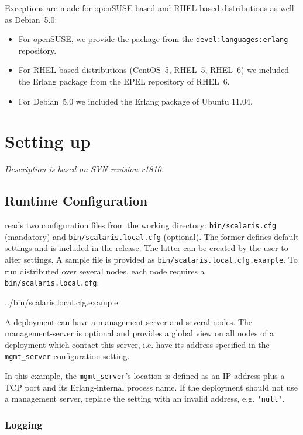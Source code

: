 \documentclass[a4paper]{scrreprt}
\newcommand{\codefile}[3][language=erlang]{
{

{#3}
}
}
\newcommand{\code}[1]{\lstinline[basicstyle=\ttfamily]!#1!}
\newcommand{\filetitle}[1]{\hbox to \linewidth{~~File \code{#1:}\hfill}}
\newcommand{\svnrev}[1]
{\hfill\emph{Description is based on SVN revision #1.}\medskip}
\begin{document}
Exceptions are made for openSUSE-based and RHEL-based distributions as well as
Debian~5.0:
\begin{itemize}
  \item For openSUSE, we provide the package from the \code{devel:languages:erlang}
repository.
  \item For RHEL-based distributions (CentOS~5, RHEL~5, RHEL~6) we included the Erlang
package from the EPEL repository of RHEL~6.
  \item For Debian~5.0 we included the Erlang package of Ubuntu 11.04.
\end{itemize}

\chapter{Setting up \scalaris{}}
\label{chapter.runscalaris}
\svnrev{r1810}

\section{Runtime Configuration}

\scalaris{} reads two configuration files from the working directory:
\code{bin/scalaris.cfg} (mandatory) and \code{bin/scalaris.local.cfg}
(optional). The former defines default settings and is included in the
release. The latter can be created by the user to alter settings.  A
sample file is provided as \code{bin/scalaris.local.cfg.example}. To run
\scalaris{} distributed over several nodes, each node requires a
\code{bin/scalaris.local.cfg}:

\codefile{scalaris.local.cfg}{../bin/scalaris.local.cfg.example}

A \scalaris{} deployment can have a management server and several nodes. The
management-server is optional and provides a global view on all nodes of a
\scalaris{} deployment which contact this server, i.e. have its address
specified in the \code{mgmt_server} configuration setting.

In this example, the \code{mgmt_server}'s location is defined as
an IP address plus a TCP port and its Erlang-internal process name.
If the deployment should not use a management server, replace the setting with
an invalid address, e.g. \code{'null'}.

\subsection{Logging}
\label{sec:logging}
\end{document}
